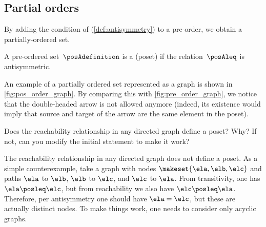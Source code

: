 
\vfill

\subsection{Partial orders}

\begin{marginfigure}
    \centering
    \caption{A partial order represented as a graph.}
    \label{fig:pos_order_graph}
\end{marginfigure}
By adding the condition of \emph{} (\cref{def:antisymmetry}) to a pre-order, we obtain a partially-ordered set.

\begin{ctdefinition}
    \label{def:poset}
    A pre-ordered set~$\posAdefinition$ is a  (poset) if the relation~$\posAleq$ is antisymmetric.
\end{ctdefinition}

An example of a partially ordered set represented as a graph is shown in \cref{fig:pos_order_graph}.
By comparing this with \cref{fig:pre_order_graph}, we notice that the double-headed arrow is not allowed anymore (indeed, its existence would imply that source and target of the arrow are the same element in the poset).

\begin{exercise}
    \label{ex:reachabilityposet}
    Does the reachability relationship in any directed graph define a poset?
    Why?
    If not, can you modify the initial statement to make it work?
\end{exercise}
\begin{solution}
    The reachability relationship in any directed graph does not define a poset.
    As a simple counterexample, take a graph with nodes $\makeset{\ela,\elb,\elc}$ and paths $\ela$ to $\elb$, $\elb$ to $\elc$, and $\elc$ to $\ela$.
    From transitivity, one has $\ela \posleq \elc$, but from reachability we also have $\elc\posleq \ela$.
    Therefore, per antisymmetry one should have $\ela=\elc$, but these are actually distinct nodes.
    To make things work, one needs to consider only acyclic graphs.
\end{solution}


